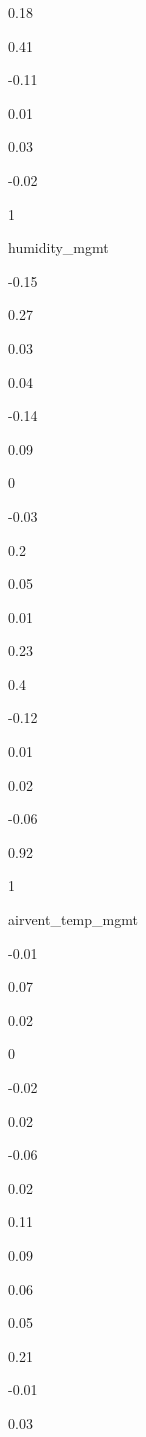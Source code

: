 \documentclass[
]{article}
\begin{document}
{0.18 }

{0.41 }

{-0.11}

{0.01 }

{0.03 }

{-0.02}

{1 }

{ }

{ }

{ }

{ }

{ }

{ }

humidity\_mgmt

{-0.15}

{0.27 }

{0.03 }

{0.04 }

{-0.14}

{0.09 }

{0 }

{-0.03}

{0.2 }

{0.05 }

{0.01 }

{0.23 }

{0.4 }

{-0.12}

{0.01 }

{0.02 }

{-0.06}

{0.92 }

{1 }

{ }

{ }

{ }

{ }

{ }

airvent\_temp\_mgmt

{-0.01}

{0.07 }

{0.02 }

{0 }

{-0.02}

{0.02 }

{-0.06}

{0.02 }

{0.11 }

{0.09 }

{0.06 }

{0.05 }

{0.21 }

{-0.01}

{0.03 }
\end{document}
